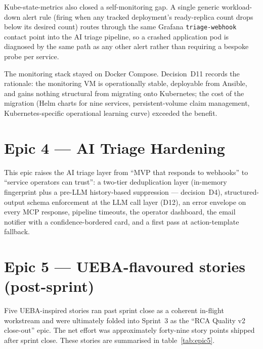 \documentclass[11pt,a4paper,oneside]{report}
\begin{document}
Kube-state-metrics also closed a self-monitoring gap.  A single
generic workload-down alert rule (firing when any tracked deployment's
ready-replica count drops below its desired count) routes through the
same Grafana \texttt{triage-webhook} contact point into the AI triage
pipeline, so a crashed application pod is diagnosed by the same path as
any other alert rather than requiring a bespoke probe per service.

The monitoring stack stayed on Docker Compose.  Decision~D11
records the rationale: the monitoring VM is operationally stable,
deployable from Ansible, and gains nothing structural from migrating
onto Kubernetes; the cost of the migration (Helm charts for nine
services, persistent-volume claim management, Kubernetes-specific
operational learning curve) exceeded the benefit.

\section{Epic 4 --- AI Triage Hardening}

This epic raises the AI triage layer from ``MVP that responds to
webhooks'' to ``service operators can trust'': a two-tier
deduplication layer (in-memory fingerprint plus a pre-LLM
history-based suppression --- decision~D4), structured-output schema
enforcement at the LLM call layer (D12), an error envelope on every
MCP response, pipeline timeouts, the operator dashboard, the email
notifier with a confidence-bordered card, and a first pass at
action-template fallback.

\section{Epic 5 --- UEBA-flavoured stories (post-sprint)}

Five UEBA-inspired stories ran past sprint close as a coherent
in-flight workstream and were ultimately folded into Sprint~3 as the
``RCA Quality v2 close-out'' epic.  The net effort was approximately
forty-nine story points shipped after sprint close.  These stories
are summarised in table~\ref{tab:epic5}.
\end{document}
